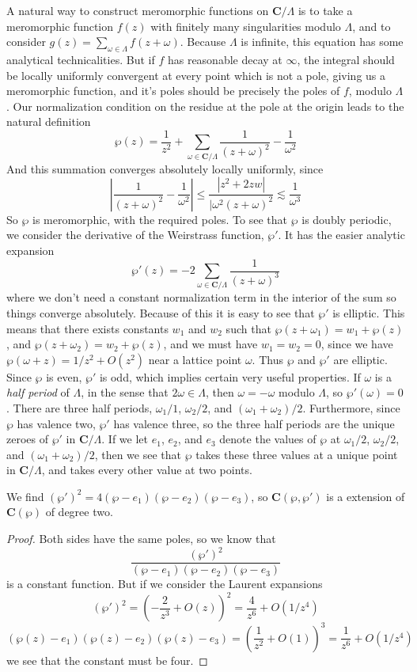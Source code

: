 A natural way to construct meromorphic functions on $\mathbf{C}/\Lambda$ is to take a meromorphic function $f(z)$ with finitely many singularities modulo $\Lambda$, and to consider $g(z) = \sum_{\omega \in \Lambda} f(z + \omega)$. Because $\Lambda$ is infinite, this equation has some analytical technicalities. But if $f$ has reasonable decay at $\infty$, the integral should be locally uniformly convergent at every point which is not a pole, giving us a meromorphic function, and it's poles should be precisely the poles of $f$, modulo $\Lambda$. Our normalization condition on the residue at the pole at the origin leads to the natural definition
%
\[ \wp(z) = \frac{1}{z^2} + \sum_{\omega \in \mathbf{C}/\Lambda} \frac{1}{(z + \omega)^2} - \frac{1}{\omega^2} \]
%
And this summation converges absolutely locally uniformly, since
%
\[ \left| \frac{1}{(z + \omega)^2} - \frac{1}{\omega^2} \right| \leq \frac{|z^2 + 2zw|}{|\omega^2(z + \omega)^2} \lesssim \frac{1}{\omega^3} \]
%
So $\wp$ is meromorphic, with the required poles. To see that $\wp$ is doubly periodic, we consider the derivative of the Weirstrass function, $\wp'$. It has the easier analytic expansion
%
\[ \wp'(z) = - 2 \sum_{\omega \in \mathbf{C}/\Lambda} \frac{1}{(z + \omega)^3} \]
%
where we don't need a constant normalization term in the interior of the sum so things converge absolutely. Because of this it is easy to see that $\wp'$ is elliptic. This means that there exists constants $w_1$ and $w_2$ such that $\wp(z + \omega_1) = w_1 + \wp(z)$, and $\wp(z + \omega_2) = w_2 + \wp(z)$, and we must have $w_1 = w_2 = 0$, since we have $\wp(\omega + z) = 1/z^2 + O(z^2)$ near a lattice point $\omega$. Thus $\wp$ and $\wp'$ are elliptic. Since $\wp$ is even, $\wp'$ is odd, which implies certain very useful properties. If $\omega$ is a {\it half period} of $\Lambda$, in the sense that $2\omega \in \Lambda$, then $\omega = -\omega$ modulo $\Lambda$, so $\wp'(\omega) = 0$. There are three half periods, $\omega_1/1$, $\omega_2/2$, and $(\omega_1 + \omega_2)/2$. Furthermore, since $\wp$ has valence two, $\wp'$ has valence three, so the three half periods are the unique zeroes of $\wp'$ in $\mathbf{C}/\Lambda$. If we let $e_1$, $e_2$, and $e_3$ denote the values of $\wp$ at $\omega_1/2$, $\omega_2/2$, and $(\omega_1 + \omega_2)/2$, then we see that $\wp$ takes these three values at a unique point in $\mathbf{C}/\Lambda$, and takes every other value at two points.

\begin{theorem}
    We find $(\wp')^2 = 4 (\wp - e_1)(\wp - e_2)(\wp - e_3)$, so $\mathbf{C}(\wp,\wp')$ is a extension of $\mathbf{C}(\wp)$ of degree two.
\end{theorem}
\begin{proof}
    Both sides have the same poles, so we know that
    \[ \frac{(\wp')^2}{(\wp - e_1)(\wp - e_2)(\wp - e_3)} \]
    is a constant function. But if we consider the Laurent expansions
    \[ (\wp')^2 = \left( -\frac{2}{z^3} + O(z) \right)^2 = \frac{4}{z^6} + O(1/z^4) \]
    \[ (\wp(z) - e_1)(\wp(z) - e_2)(\wp(z) - e_3) = \left( \frac{1}{z^2} + O(1) \right)^3 = \frac{1}{z^6} + O(1/z^4) \]
    we see that the constant must be four.
\end{proof}

